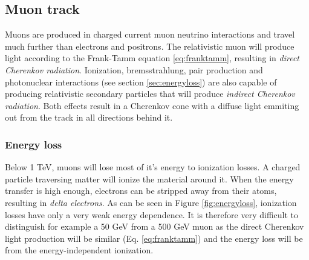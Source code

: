 \subsection{Muon track}
Muons are produced in charged current muon neutrino interactions and travel much further than electrons and positrons. The relativistic muon will produce light according to the Frank-Tamm equation \ref{eq:franktamm}, resulting in \textit{direct Cherenkov radiation}. Ionization, bremsstrahlung, pair production and photonuclear interactions (see section \ref{sec:energyloss}) are also capable of producing relativistic secondary particles that will produce \textit{indirect Cherenkov radiation}. Both effects result in a Cherenkov cone with a diffuse light emmiting out from the track in all directions behind it. 

\subsubsection{Energy loss}
\label{subsub:energyloss}
Below 1 TeV, muons will lose most of it's energy to ionization losses. A charged particle traversing matter will ionize the material around it. When the energy transfer is high enough, electrons can be stripped away from their atoms, resulting in \textit{delta electrons}. As can be seen in Figure \ref{fig:energyloss}, ionization losses have only a very weak energy dependence. It is therefore very difficult to distinguish for example a 50 GeV from a 500 GeV muon as the direct Cherenkov light production will be similar (Eq. \ref{eq:franktamm}) and the energy loss will be from the energy-independent ionization.

